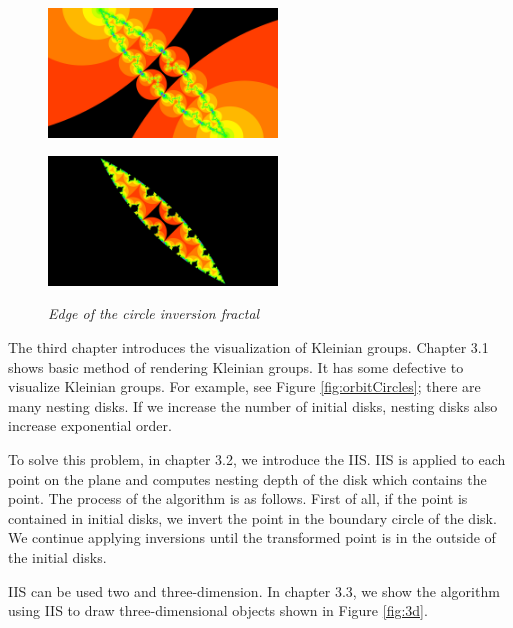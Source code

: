 \documentclass[uplatex, dvipdfmx]{article}
\begin{document}
\begin{figure}[htbp]
 \begin{minipage}[t]{0.5\hsize}
  \center
  \includegraphics[height=1.35in, keepaspectratio]{../src/img/application/internal/schottky.png}
  \subcaption{\textit{}}
  \label{fig:schottkyAll}
  \hspace*{\fill}
 \end{minipage}
 \begin{minipage}[t]{0.5\hsize}
  \center
  \includegraphics[height=1.35in, keepaspectratio]{../src/img/application/internal/schottkyEdge.png}
  \subcaption{\textit{}}
  \label{fig:schottkyEdge}
  \hspace*{\fill}
 \end{minipage}
 \caption{\textit{Edge of the circle inversion fractal}}
 \label{fig:schottkyDivide}
\end{figure}

The third chapter introduces the visualization of Kleinian groups.
Chapter 3.1 shows basic method of rendering Kleinian groups.
It has some defective to visualize Kleinian groups.
For example, see Figure \ref{fig:orbitCircles}; there are many nesting
disks. If we increase the number of initial disks, nesting disks also
increase exponential order.

To solve this problem, in chapter 3.2, we introduce the IIS.
IIS is applied to each point on the plane and computes nesting depth of
the disk which contains the point.
The process of the algorithm is as follows.
First of all, if the point is contained in initial disks, we invert the
point in the boundary circle of the disk.
We continue applying inversions until the transformed point is in the
outside of the initial disks.

IIS can be used two and three-dimension.
In chapter 3.3, we show the algorithm using IIS to draw three-dimensional
objects shown in Figure \ref{fig:3d}.
\end{document}
